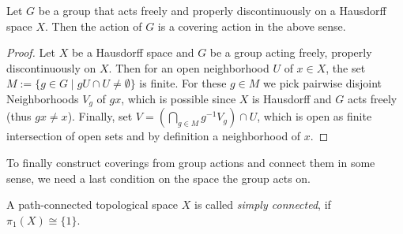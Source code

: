 \begin{lemma}
    Let \(G\) be a group that acts freely and properly discontinuously on a Hausdorff space \(X\).
    Then the action of \(G\) is a covering action in the above sense.
\end{lemma}
\begin{proof}
    Let \(X\) be a Hausdorff space and \(G\) be a group acting freely, properly discontinuously on \(X\).
    Then for an open neighborhood \(U\) of \(x\in X\), the set \(M := \{g \in G \;\vert\; gU \cap U \neq \emptyset\}\) is finite.
    For these \(g \in M\) we pick pairwise disjoint Neighborhoods \(V_g\) of \(gx\), which is possible since \(X\) is Hausdorff and \(G\) acts freely (thus \(gx \neq x\)).
    Finally, set \(V = \left(\bigcap_{g \in M} g^{-1} V_g \right) \cap U\), which is open as finite intersection of open sets and by definition a neighborhood of \(x\).
\end{proof}

To finally construct coverings from group actions and connect them in some sense, we need a last condition on the space the group acts on.

\begin{definition}
    A path-connected topological space \(X\) is called \emph{simply connected}, if \(\pi_1(X)\cong \{1\}\).
\end{definition}

